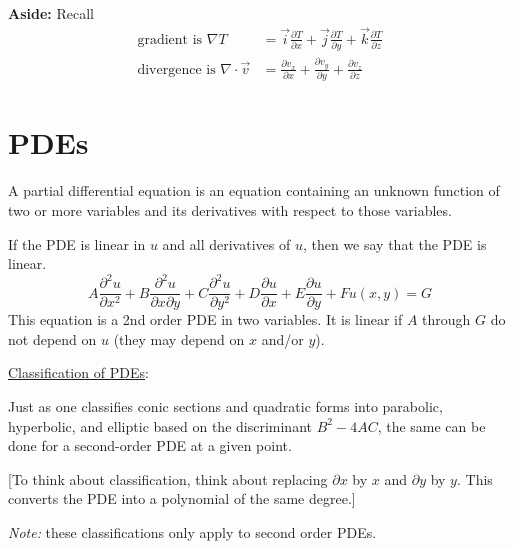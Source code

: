 \documentclass[12pt]{article}
\begin{document}
\textbf{Aside:} Recall
%
\begin{align}
\text{gradient is } \nabla T &= \vec{i}\frac{\partial T}{\partial x} + \vec{j}\frac{\partial T}{\partial y} + \vec{k}\frac{\partial T}{\partial z} \nonumber \\
%
\text{divergence is } \nabla \cdot \vec{v} &= \frac{\partial v_x}{\partial x} + \frac{\partial v_y}{\partial y} + \frac{\partial v_z}{\partial z} \nonumber
\end{align}

\section{PDEs}

A partial differential equation is an equation containing an unknown function of two or more variables and its derivatives with respect to those variables. 

If the PDE is linear in $u$ and all derivatives of $u$, then we say that the PDE is linear.
%
\begin{equation}
A\frac{\partial^2 u}{\partial x^2} + B\frac{\partial^2 u}{\partial x \partial  y} + C\frac{\partial^2 u}{\partial y^2} + D\frac{\partial u}{\partial x} + E\frac{\partial u}{\partial y} + Fu(x,y) = G \nonumber
\end{equation}
%
This equation is a 2nd order PDE in two variables. It is linear if $A$ through $G$ do not depend on $u$ (they may depend on $x$ and/or $y$). 

\vspace*{1em}
\underline{Classification of PDEs}:%

Just as one classifies conic sections and quadratic forms into parabolic, hyperbolic, and elliptic based on the discriminant $B^2 - 4AC$, the same can be done for a second-order PDE at a given point. 

[To think about classification, think about replacing $\partial x$ by $x$ and  $\partial y$ by $y$. This converts the PDE into a polynomial of the same degree.]

\textit{Note:} these classifications only apply to second order PDEs. 
\end{document}
